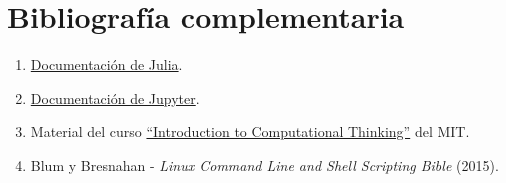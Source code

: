 \documentclass[a4paper]{article}
\begin{document}
\section*{Bibliografía complementaria} \label{Sec: Bibliografía complementaria}

\begin{enumerate}

    \item \href{https://docs.julialang.org/en/v1/}{Documentación de Julia}.

    \item \href{https://docs.jupyter.org/en/latest/}{Documentación de Jupyter}.

    \item Material del curso \href{https://computationalthinking.mit.edu/Spring21/}{``Introduction to Computational Thinking''} del MIT.

    \item Blum y Bresnahan - \emph{Linux Command Line and Shell Scripting Bible} (2015).
\end{enumerate}
\end{document}
